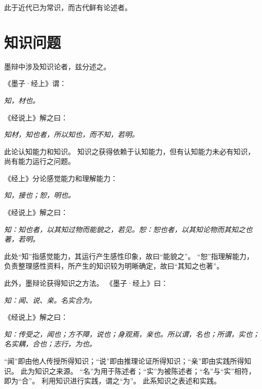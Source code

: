 \documentclass[11pt]{article}
\begin{document}
此于近代已为常识，而古代鲜有论述者。

\section{知识问题}
墨辩中涉及知识论者，兹分述之。

\par

《墨子·经上》谓：

\textit{知，材也。}

《经说上》解之曰：

\textit{知材，知也者，所以知也，而不知，若明。}

此论认知能力和知识。
知识之获得依赖于认知能力，但有认知能力未必有知识，尚有能力运行之问题。

\par

《经上》分论感觉能力和理解能力：

\textit{知，接也；恕，明也。}

《经说上》解之曰：

\textit{知：知也者，以其知过物而能貌之，若见。恕：恕也者，以其知论物而其知之也著，若明。}

此处“知”指感觉能力，其运行产生感性印象，故曰“能貌之”。
“恕”指理解能力，负责整理感性资料，所产生的知识较为明晰确定，故曰“其知之也著”。

\par

此外，墨辩论获得知识之方法。
《墨子·经上》曰：

\textit{知：闻、说、亲。名实合为。}

《经说上》解之曰：

\textit{知：传受之，闻也；方不障，说也；身观焉，亲也。所以谓，名也；所谓，实也；名实耦，合也；志行，为也。}

“闻”即由他人传授所得知识；“说”即由推理论证所得知识；“亲”即由实践所得知识。
此为知识之来源。
“名”为用于陈述者；“实”为被陈述者；“名”与“实”相符，即为“合”。
利用知识进行实践，谓之“为”。
此系知识之表述和实践。
  
\end{document}
